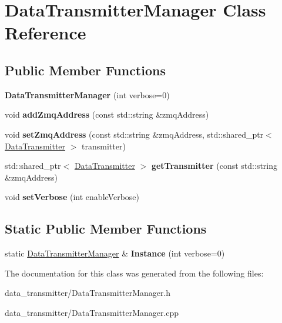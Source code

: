 \hypertarget{classDataTransmitterManager}{\section{Data\-Transmitter\-Manager Class Reference}
\label{classDataTransmitterManager}
}
\subsection*{Public Member Functions}
\begin{DoxyCompactItemize}
\item 
\hypertarget{classDataTransmitterManager_a5ed7c0dca4e77b51170bfe8859b49b3a}{{\bfseries Data\-Transmitter\-Manager} (int verbose=0)}\label{classDataTransmitterManager_a5ed7c0dca4e77b51170bfe8859b49b3a}

\item 
\hypertarget{classDataTransmitterManager_af5b0323ec99b074c47c01b10ad6399d3}{void {\bfseries add\-Zmq\-Address} (const std\-::string \&zmq\-Address)}\label{classDataTransmitterManager_af5b0323ec99b074c47c01b10ad6399d3}

\item 
\hypertarget{classDataTransmitterManager_a899a8ed901e0351c0d287735d975c59e}{void {\bfseries set\-Zmq\-Address} (const std\-::string \&zmq\-Address, std\-::shared\-\_\-ptr$<$ \hyperlink{classDataTransmitter}{Data\-Transmitter} $>$ transmitter)}\label{classDataTransmitterManager_a899a8ed901e0351c0d287735d975c59e}

\item 
\hypertarget{classDataTransmitterManager_af0954c723fd9d7716e62725366c559fd}{std\-::shared\-\_\-ptr$<$ \hyperlink{classDataTransmitter}{Data\-Transmitter} $>$ {\bfseries get\-Transmitter} (const std\-::string \&zmq\-Address)}\label{classDataTransmitterManager_af0954c723fd9d7716e62725366c559fd}

\item 
\hypertarget{classDataTransmitterManager_ab1668356e2eef3e79a94969e05ed4a9d}{void {\bfseries set\-Verbose} (int enable\-Verbose)}\label{classDataTransmitterManager_ab1668356e2eef3e79a94969e05ed4a9d}

\end{DoxyCompactItemize}
\subsection*{Static Public Member Functions}
\begin{DoxyCompactItemize}
\item 
\hypertarget{classDataTransmitterManager_afc830e6741c03764384d73d927778b02}{static \hyperlink{classDataTransmitterManager}{Data\-Transmitter\-Manager} \& {\bfseries Instance} (int verbose=0)}\label{classDataTransmitterManager_afc830e6741c03764384d73d927778b02}

\end{DoxyCompactItemize}


The documentation for this class was generated from the following files\-:\begin{DoxyCompactItemize}
\item 
data\-\_\-transmitter/Data\-Transmitter\-Manager.\-h\item 
data\-\_\-transmitter/Data\-Transmitter\-Manager.\-cpp\end{DoxyCompactItemize}
